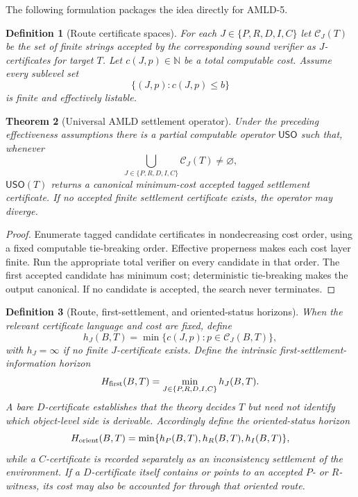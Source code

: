 \documentclass[11pt]{article}
\newtheorem{definition}{Definition}[section]
\newtheorem{theorem}[definition]{Theorem}
\theoremstyle{remark}
\newcommand{\N}{\mathbb N}
\begin{document}
The following formulation packages the idea directly for AMLD-5.

\begin{definition}[Route certificate spaces]
For each $J\in\{P,R,D,I,C\}$ let $\mathcal C_J(T)$ be the set of finite strings accepted by the corresponding sound verifier as $J$-certificates for target $T$. Let $c(J,p)\in\N$ be a total computable cost. Assume every sublevel set
\[
\{(J,p):c(J,p)\le b\}
\]
is finite and effectively listable.
\end{definition}

\begin{theorem}[Universal AMLD settlement operator]
Under the preceding effectiveness assumptions there is a partial computable operator $\mathsf{USO}$ such that, whenever
\[
\bigcup_{J\in\{P,R,D,I,C\}}\mathcal C_J(T)\ne\varnothing,
\]
$\mathsf{USO}(T)$ returns a canonical minimum-cost accepted tagged settlement certificate. If no accepted finite settlement certificate exists, the operator may diverge.
\end{theorem}

\begin{proof}
Enumerate tagged candidate certificates in nondecreasing cost order, using a fixed computable tie-breaking order. Effective properness makes each cost layer finite. Run the appropriate total verifier on every candidate in that order. The first accepted candidate has minimum cost; deterministic tie-breaking makes the output canonical. If no candidate is accepted, the search never terminates.
\end{proof}

\begin{definition}[Route, first-settlement, and oriented-status horizons]
When the relevant certificate language and cost are fixed, define
\[
h_J(B,T)=\min\{c(J,p):p\in\mathcal C_J(B,T)\},
\]
with $h_J=\infty$ if no finite $J$-certificate exists. Define the intrinsic \emph{first-settlement-information horizon}
\[
H_{\rm first}(B,T)=\min_{J\in\{P,R,D,I,C\}}h_J(B,T).
\]
A bare $D$-certificate establishes that the theory decides $T$ but need not identify which object-level side is derivable. Accordingly define the \emph{oriented-status horizon}
\[
H_{\rm orient}(B,T)=\min\{h_P(B,T),h_R(B,T),h_I(B,T)\},
\]
while a $C$-certificate is recorded separately as an inconsistency settlement of the environment. If a $D$-certificate itself contains or points to an accepted $P$- or $R$-witness, its cost may also be accounted for through that oriented route.
\end{definition}
\end{document}
